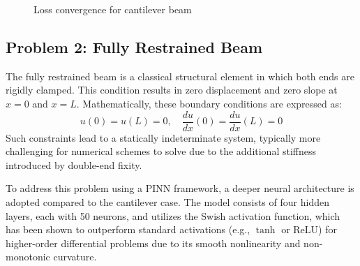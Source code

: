 \documentclass[12pt]{article}
\begin{document}
\begin{figure}[htbp]
    \centering
    \caption{Loss convergence for cantilever beam}
    \label{fig:cantilever_convergence}
\end{figure}


\subsection{Problem 2: Fully Restrained Beam}

The fully restrained beam is a classical structural element in which both ends are rigidly clamped. This condition results in zero displacement and zero slope at $x=0$ and $x=L$. Mathematically, these boundary conditions are expressed as:
\[
u(0) = u(L) = 0, \quad \frac{du}{dx}(0) = \frac{du}{dx}(L) = 0
\]
Such constraints lead to a statically indeterminate system, typically more challenging for numerical schemes to solve due to the additional stiffness introduced by double-end fixity.

To address this problem using a PINN framework, a deeper neural architecture is adopted compared to the cantilever case. The model consists of four hidden layers, each with 50 neurons, and utilizes the Swish activation function, which has been shown to outperform standard activations (e.g., $\tanh$ or ReLU) for higher-order differential problems due to its smooth nonlinearity and non-monotonic curvature.
\end{document}
